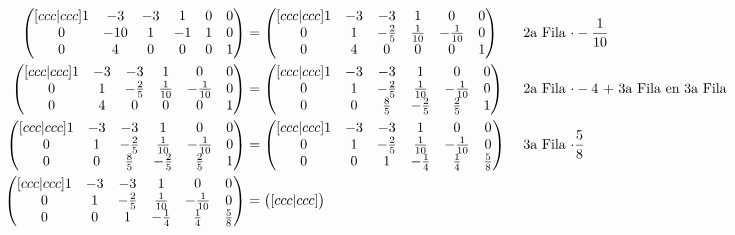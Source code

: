 \documentclass[letterpaper]{article}
\renewcommand{\*}{\cdot}
\theoremstyle{definition}
\begin{document}
\begin{align*}
	\begin{pmatrix}[ccc|ccc]
	1 & -3 & -3 & 1 & 0 & 0\\
	0 & -10 & 1 & -1 & 1 & 0\\
	0 & 4 & 0 & 0 & 0 & 1
	\end{pmatrix} &= \begin{pmatrix}[ccc|ccc]
	1 & -3 & -3 & 1 & 0 & 0\\
	0 & 1 & -\frac{2}{5} & \frac{1}{10} & -\frac{1}{10} & 0\\
	0 & 4 & 0 & 0 & 0 & 1
	\end{pmatrix}&& \text{ 2a Fila $ \* -\frac{1}{10}$ }\\
\begin{pmatrix}[ccc|ccc]
1 & -3 & -3 & 1 & 0 & 0\\
0 & 1 & -\frac{2}{5} & \frac{1}{10} & -\frac{1}{10} & 0\\
0 & 4 & 0 & 0 & 0 & 1
\end{pmatrix}& = \begin{pmatrix}[ccc|ccc]
	1 & -3 & -3 & 1 & 0 & 0\\
	0 & 1 & -\frac{2}{5} & \frac{1}{10} & -\frac{1}{10} & 0\\
	0 & 0 & \frac{8}{5} & -\frac{2}{5} & \frac{2}{5} & 1
	\end{pmatrix} && \text{ 2a Fila $ \* -4$ + 3a Fila en 3a Fila }\\
	\begin{pmatrix}[ccc|ccc]
	1 & -3 & -3 & 1 & 0 & 0\\
	0 & 1 & -\frac{2}{5} & \frac{1}{10} & -\frac{1}{10} & 0\\
	0 & 0 & \frac{8}{5} & -\frac{2}{5} & \frac{2}{5} & 1
	\end{pmatrix}  &= \begin{pmatrix}[ccc|ccc]
	1 & -3 & -3 & 1 & 0 & 0\\
	0 & 1 & -\frac{2}{5} & \frac{1}{10} & -\frac{1}{10} & 0\\
	0 & 0 & 1 & -\frac{1}{4} & \frac{1}{4} & \frac{5}{8}
	\end{pmatrix} && \text{ 3a Fila $ \* \frac{5}{8}$}\\
	\begin{pmatrix}[ccc|ccc]
	1 & -3 & -3 & 1 & 0 & 0\\
	0 & 1 & -\frac{2}{5} & \frac{1}{10} & -\frac{1}{10} & 0\\
	0 & 0 & 1 & -\frac{1}{4} & \frac{1}{4} & \frac{5}{8}
	\end{pmatrix} &= \begin{pmatrix}[ccc|ccc]

\end{pmatrix}
\end{align*}
\end{document}
